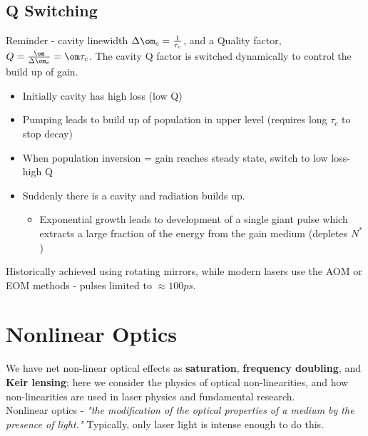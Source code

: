 \documentclass[a4paper, 11pt, normalem]{report}
\begin{document}
\section{Q Switching}
Reminder - cavity linewidth $\Delta\om_c = \frac{1}{\tau_c}$, and a Quality factor, $Q = \frac{\om}{\Delta\om_c} = \om\tau_c$.
The cavity Q factor is switched dynamically to control the build up of gain.
\begin{figure}[H]
    \centering
\end{figure}
\begin{itemize}
    \item Initially cavity has high loss (low Q)
    \item Pumping leads to build up of population in upper level (requires long $\tau_c$ to stop decay)
    \item When population inversion = gain reaches steady state, switch to low loss-high Q
    \item Suddenly there is a cavity and radiation builds up.
        \begin{itemize}
            \item Exponential growth leads to development of a single giant pulse which extracts a large fraction of the energy from the gain medium (depletes $N^*$)
        \end{itemize}
\end{itemize}
Historically achieved using rotating mirrors, while modern lasers use the AOM or EOM methods - pulses limited to $\approx 100ps$.

\chapter{Nonlinear Optics}
We have net non-linear optical effects as \textbf{saturation}, \textbf{frequency doubling}, and \textbf{Keir lensing}; here we consider the physics of optical non-linearities, and how non-linearities are used in laser physics and fundamental research. \\
Nonlinear optics - \emph{"the modification of the optical properties of a medium by the presence of light."}
Typically, only laser light is intense enough to do this.
\end{document}

